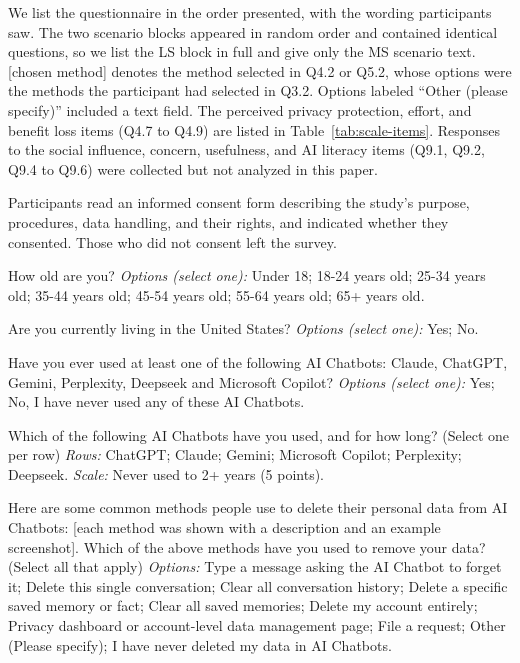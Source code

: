 {\footnotesize
{}
We list the questionnaire in the order presented, with the wording participants saw.
%
The two scenario blocks appeared in random order and contained identical questions, so we list the LS block in full and give only the MS scenario text.
%
[chosen method] denotes the method selected in Q4.2 or Q5.2, whose options were the methods the participant had selected in Q3.2.
%
Options labeled ``Other (please specify)'' included a text field.
%
The perceived privacy protection, effort, and benefit loss items (Q4.7 to Q4.9) are listed in Table~\ref{tab:scale-items}.
%
Responses to the social influence, concern, usefulness, and AI literacy items (Q9.1, Q9.2, Q9.4 to Q9.6) were collected but not analyzed in this paper.

 Participants read an informed consent form describing the study's purpose, procedures, data handling, and their rights, and indicated whether they consented. Those who did not consent left the survey.

\begin{description}[leftmargin=0pt,itemsep=1pt,font=\normalfont]
\item[\textbf{Q2.1}] How old are you? \emph{Options (select one):} Under 18; 18-24 years old; 25-34 years old; 35-44 years old; 45-54 years old; 55-64 years old; 65+ years old.
\item[\textbf{Q2.2}] Are you currently living in the United States? \emph{Options (select one):} Yes; No.
\item[\textbf{Q2.3}] Have you ever used at least one of the following AI Chatbots: Claude, ChatGPT, Gemini, Perplexity, Deepseek and Microsoft Copilot? \emph{Options (select one):} Yes; No, I have never used any of these AI Chatbots.
\end{description}

\begin{description}[leftmargin=0pt,itemsep=1pt,font=\normalfont]
\item[\textbf{Q3.1}] Which of the following AI Chatbots have you used, and for how long? (Select one per row) \emph{Rows:} ChatGPT; Claude; Gemini; Microsoft Copilot; Perplexity; Deepseek. \emph{Scale:} Never used to 2+ years (5 points).
\item[\textbf{Q3.2}] Here are some common methods people use to delete their personal data from AI Chatbots: [each method was shown with a description and an example screenshot]. Which of the above methods have you used to remove your data? (Select all that apply) \emph{Options:} Type a message asking the AI Chatbot to forget it; Delete this single conversation; Clear all conversation history; Delete a specific saved memory or fact; Clear all saved memories; Delete my account entirely; Privacy dashboard or account-level data management page; File a request; Other (Please specify); I have never deleted my data in AI Chatbots.
\end{description}

}

